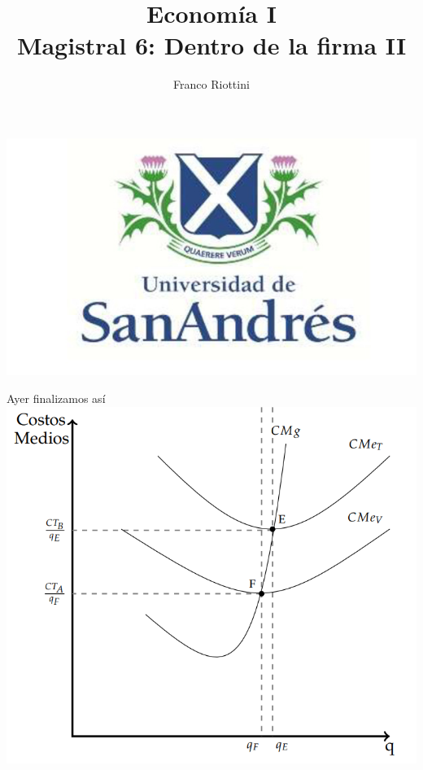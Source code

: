 \documentclass{beamer}
\title[Economía I]{Economía I \vspace{4mm}
\\ Magistral 6: Dentro de la firma II}
\date{}
\author[Riottini]{Franco Riottini}
\institute[]{Universidad de San Andrés}
\begin{document}
\begin{frame}
\titlepage
\centering
\includegraphics[scale=0.2]{../Figures/logoUDESA.jpg} 
\end{frame}


\begin{frame}{Ayer finalizamos así}
    \centering
    \includegraphics[scale=0.5]{../Figures/C13.8b.png} 
\end{frame}
\end{document}
